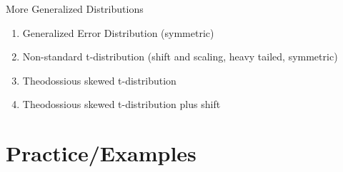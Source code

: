 \documentclass[11pt, openany]{book}              %
\begin{document}
More Generalized Distributions

\begin{enumerate}
	\item Generalized Error Distribution (symmetric)
	\item Non-standard t-distribution (shift and scaling, heavy tailed, symmetric)
	\item Theodossious skewed t-distribution
	\item Theodossious skewed t-distribution plus shift
\end{enumerate}


\section{Practice/Examples}

\begin{enumerate}


\end{enumerate}
\end{document}
